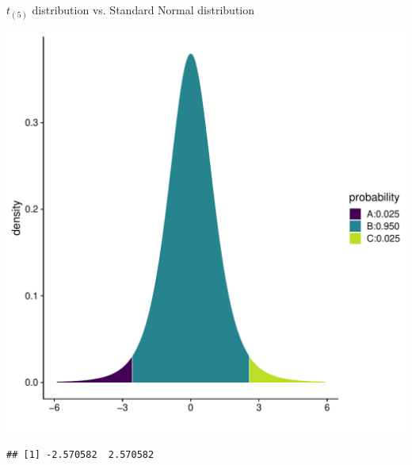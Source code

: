\documentclass[10pt]{beamer}\usepackage[]{graphicx}\usepackage[]{color}
\makeatletter
\def\maxwidth{ %
  \ifdim\Gin@nat@width>\linewidth
    \linewidth
  \else
    \Gin@nat@width
  \fi
}
\newenvironment{kframe}{%
 \def\at@end@of@kframe{}%
 \ifinner\ifhmode%
  \def\at@end@of@kframe{\end{minipage}}%
  \begin{minipage}{\columnwidth}%
 \fi\fi%
 \def\FrameCommand##1{\hskip\@totalleftmargin \hskip-\fboxsep
 \colorbox{shadecolor}{##1}\hskip-\fboxsep
     \hskip-\linewidth \hskip-\@totalleftmargin \hskip\columnwidth}%
 \MakeFramed {\advance\hsize-\width
   \@totalleftmargin\z@ \linewidth\hsize
   \@setminipage}}%
 {\par\unskip\endMakeFramed%
 \at@end@of@kframe}
\newenvironment{knitrout}{}{} %
\makeatother
\begin{document}
\begin{frame}[fragile]{$t_{(5)}$ distribution vs. Standard Normal distribution}
\begin{minipage}{0.5\textwidth}
\begin{knitrout}
{\centering \includegraphics[width=\maxwidth]{figure/unnamed-chunk-4-1} 

}


\begin{kframe}\begin{verbatim}
## [1] -2.570582  2.570582
\end{verbatim}
\end{kframe}
\end{knitrout}
	\end{minipage}
\end{frame}
\end{document}
